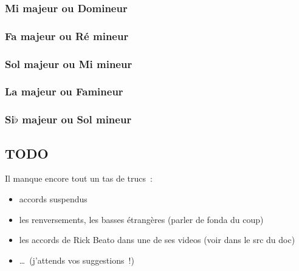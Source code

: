 \documentclass[11pt]{article}
\begin{document}
\subsubsection{Mi majeur ou Do\shrp mineur}


\subsubsection{Fa majeur ou Ré mineur}


\subsubsection{Sol majeur ou Mi mineur}


\subsubsection{La majeur ou Fa\shrp mineur}


\subsubsection{Si$\flat$ majeur ou Sol mineur}


\subsection{TODO}




Il manque encore tout un tas de trucs~:

\begin{itemize}
\item accords suspendus
\item les renversements, les basses étrangères (parler de fonda du coup)
\item les accords de Rick Beato dans une de ses videos (voir dans le src du doc)
\item \ldots~(j’attends vos suggestions~!)
\end{itemize}
\end{document}
